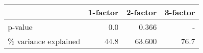 \begin{tabular}{lrrr}
\toprule
 & 1-factor & 2-factor & 3-factor \\ 
\midrule\addlinespace[2.5pt]
p-value & 0.0 & 0.366 & - \\ 
\% variance explained & 44.8 & 63.600 & 76.7 \\ 
\bottomrule
\end{tabular}

